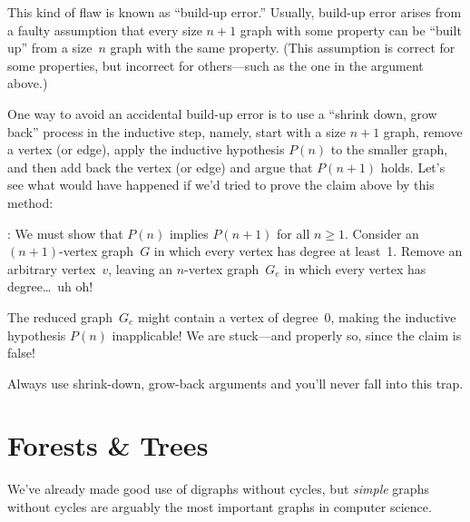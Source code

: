 This kind of flaw is known as ``build-up error.''  Usually, build-up
error arises from a faulty assumption that every size $n + 1$ graph
with some property can be ``built up'' from a size~$n$ graph with the
same property.  (This assumption is correct for some properties, but
incorrect for others---such as the one in the argument above.)

One way to avoid an accidental build-up error is to use a ``shrink
down, grow back'' process in the inductive step, namely, start with a
size $n+1$ graph, remove a vertex (or edge), apply the inductive
hypothesis $P(n)$ to the smaller graph, and then add back the vertex
(or edge) and argue that $P(n + 1)$ holds.  Let's see what would have
happened if we'd tried to prove the claim above by this method:

: We must show that $P(n)$
implies $P(n + 1)$ for all $n \ge 1$.  Consider an $(n + 1)$-vertex
graph~$G$ in which every vertex has degree at least~1.  Remove an
arbitrary vertex~$v$, leaving an $n$-vertex graph~$G_e$ in which every
vertex has degree\dots\ uh oh!

The reduced graph~$G_e$ might contain a vertex of degree~0, making the
inductive hypothesis $P(n)$ inapplicable!  We are stuck---and
properly so, since the claim is false!

Always use shrink-down, grow-back arguments and you'll never fall into
this trap.


\fi

\begin{problems}
\classproblems
{}

\homeworkproblems
{}

\examproblems
{}

\end{problems}

\section{Forests \& Trees}\label{trees-sec}
We've already made good use of digraphs without cycles, but
\emph{simple} graphs without cycles are arguably the most important
graphs in computer science.

